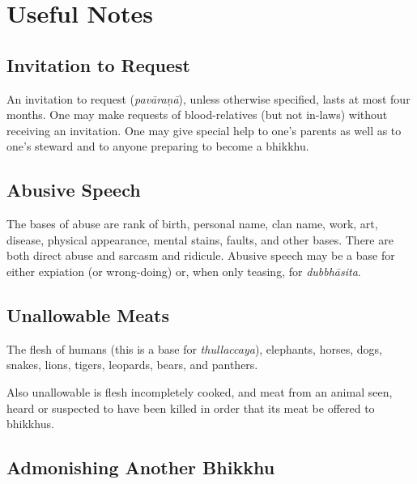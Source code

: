\chapter{Useful Notes}

\section*{Invitation to Request}

An invitation to request (\emph{pavāraṇā}), unless otherwise specified, lasts at
most four months. One may make requests of blood-relatives (but not in-laws)
without receiving an invitation. One may give special help to one's parents as
well as to one's steward and to anyone preparing to become a bhikkhu.


\section*{Abusive Speech}

The bases of abuse are rank of birth, personal name, clan name, work, art,
disease, physical appearance, mental stains, faults, and other bases. There are
both direct abuse and sarcasm and ridicule. Abusive speech may be a base for
either expiation (or wrong-doing) or, when only teasing, for \emph{dubbhāsita}.


\section*{Unallowable Meats}

The flesh of humans (this is a base for \emph{thullaccaya}), elephants, horses,
dogs, snakes, lions, tigers, leopards, bears, and panthers.\\
\mbox{}

Also unallowable is flesh incompletely cooked, and meat from an animal seen,
heard or suspected to have been killed in order that its meat be offered to
bhikkhus.\\
\mbox{}

\vspace*{-\baselineskip}

\section*{Admonishing Another Bhikkhu}

